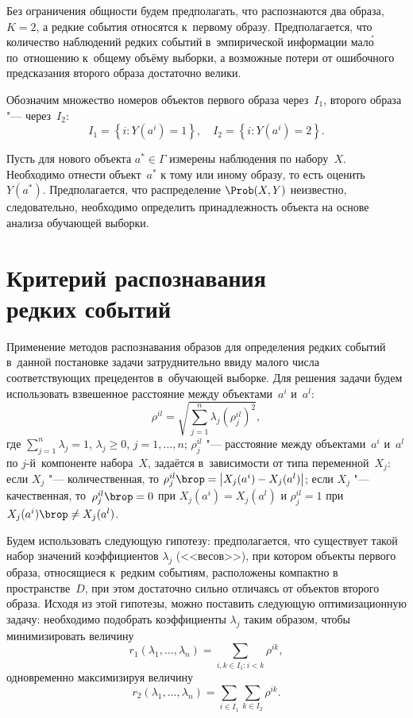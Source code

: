\documentclass[twoside]{article}
\begin{document}
Без ограничения общности будем предполагать, что распознаются два образа,
$K=2$, а редкие события относятся к~первому образу. Предполагается, что
количество наблюдений редких событий в~эмпирической информации мал\'о
по~отношению к~общему объёму выборки, а возможные потери от ошибочного
предсказания второго образа достаточно велики.

Обозначим множество номеров объектов первого образа через~$I_1$, второго
образа "--- через~$I_2$:
$$
I_1=\left\{i\colon Y(a^i)=1\right\},\quad I_2=\left\{i\colon Y(a^i)=2\right\}.
$$

Пусть для нового объекта $a^*\in \Gamma$ измерены наблюдения по набору~$X$.
Необходимо отнести объект~$a^*$ к тому или иному образу, то есть оценить~$Y(a^*)$.
Предполагается, что распределение $\Prob(X,Y)$  неизвестно, следовательно, необходимо
определить принадлежность объекта на основе анализа обучающей выборки.

\section{Критерий распознавания\\ редких событий}
Применение методов распознавания образов для определения редких
событий в~данной постановке задачи затруднительно ввиду малого числа
соответствующих прецедентов в~обучающей \mbox{выборке}. Для решения задачи
будем использовать взвешенное расстояние между объектами~$a^i$
и~$a^l$:
$$
\rho^{il}=\sqrt{\sum_{j=1}^n \lambda_j \left(\rho_j^{il}\right)^2},
$$
где $\sum\limits_{j=1}^n \lambda_j {=}1$,\: $\lambda_j{\geq} 0$,\:
$j=1,\ldots,n$; \: $\rho_j^{il}$ "--- расстояние между
объектами~$a^i$ и~$a^l$ по $j$-й~компоненте набора~$X$, задаётся
в~зависимости от типа переменной~$X_j$: если $X_j$  "---
количественная, то $\rho_j^{il}\brop=\left|X_j(a^i)-X_j(a^l)\right|$;\:
если $X_j$  "--- качественная, то~$\rho_j ^{il}\brop= 0$ при
$X_j(a^i)=X_j(a^l)$ и $\rho_j ^{il} = 1$ при $X_j(a^i)\brop\neq
X_j(a^l)$.

Будем использовать следующую гипотезу:
предполагается, что существует такой набор значений коэффициентов $\lambda_j$ (<<весов>>), при котором
объекты первого образа, относящиеся к~редким событиям, расположены компактно
в пространстве~$D$, при этом достаточно сильно отличаясь от объектов второго образа.
Исходя из этой гипотезы, можно поставить следующую оптимизационную задачу:
необходимо подобрать коэффициенты $\lambda_j$ таким образом, чтобы минимизировать величину
$$r_1(\lambda_1,\ldots,\lambda_n)=\sum_{i,k\in I_1\colon i<k} \!\!\!\!\rho^{ik},$$ одновременно
максимизируя величину
$$r_2(\lambda_1,\ldots,\lambda_n)=\sum_{i\in I_1}\sum_{k\in I_2} \rho^{ik}.$$
\end{document}
